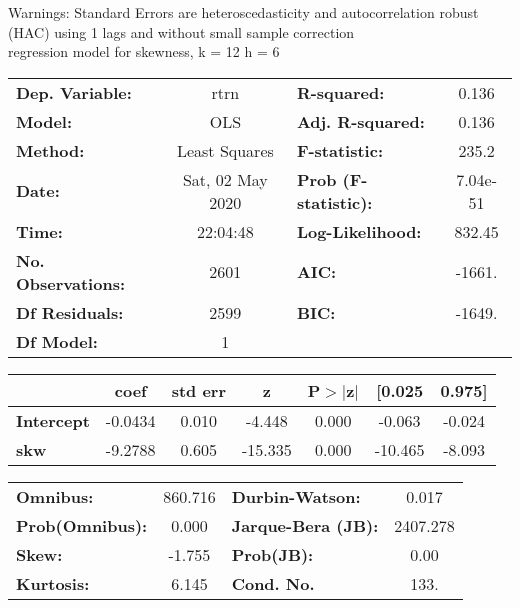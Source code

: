 Warnings: \newline
 [1] Standard Errors are heteroscedasticity and autocorrelation robust (HAC) using 1 lags and without small sample correction\\ 

regression model for skewness, k = 12 h = 6\begin{center}
\begin{tabular}{lclc}
\toprule
\textbf{Dep. Variable:}    &       rtrn       & \textbf{  R-squared:         } &     0.136   \\
\textbf{Model:}            &       OLS        & \textbf{  Adj. R-squared:    } &     0.136   \\
\textbf{Method:}           &  Least Squares   & \textbf{  F-statistic:       } &     235.2   \\
\textbf{Date:}             & Sat, 02 May 2020 & \textbf{  Prob (F-statistic):} &  7.04e-51   \\
\textbf{Time:}             &     22:04:48     & \textbf{  Log-Likelihood:    } &    832.45   \\
\textbf{No. Observations:} &        2601      & \textbf{  AIC:               } &    -1661.   \\
\textbf{Df Residuals:}     &        2599      & \textbf{  BIC:               } &    -1649.   \\
\textbf{Df Model:}         &           1      & \textbf{                     } &             \\
\bottomrule
\end{tabular}
\begin{tabular}{lcccccc}
                   & \textbf{coef} & \textbf{std err} & \textbf{z} & \textbf{P$> |$z$|$} & \textbf{[0.025} & \textbf{0.975]}  \\
\midrule
\textbf{Intercept} &      -0.0434  &        0.010     &    -4.448  &         0.000        &       -0.063    &       -0.024     \\
\textbf{skw}       &      -9.2788  &        0.605     &   -15.335  &         0.000        &      -10.465    &       -8.093     \\
\bottomrule
\end{tabular}
\begin{tabular}{lclc}
\textbf{Omnibus:}       & 860.716 & \textbf{  Durbin-Watson:     } &    0.017  \\
\textbf{Prob(Omnibus):} &   0.000 & \textbf{  Jarque-Bera (JB):  } & 2407.278  \\
\textbf{Skew:}          &  -1.755 & \textbf{  Prob(JB):          } &     0.00  \\
\textbf{Kurtosis:}      &   6.145 & \textbf{  Cond. No.          } &     133.  \\
\bottomrule
\end{tabular}
\end{center}

